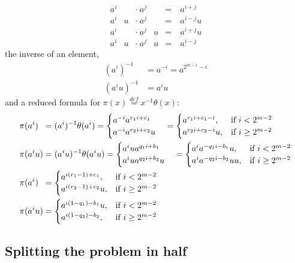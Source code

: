 \documentclass[11pt]{llncs}
\begin{document}
\[ \begin{aligned}
	a^i&  & \cdot\ a^j&  & =\ &a^{i+j} \\
	a^i&u & \cdot\ a^j&  & =\ &a^{i-j}u \\
	a^i&  & \cdot\ a^j&u & =\ &a^{i+j}u \\
	a^i&u & \cdot\ a^j&u & =\ &a^{i-j}
\end{aligned} \]
the inverse of an element,
\[ \begin{aligned}
(a^i)^{-1} &= a^{-i} = a^{2^{m-1}-i} \\
(a^iu)^{-1} &= a^iu
\end{aligned} \]
and a reduced formula for $\pi(x) \stackrel{def}{=} x^{-1}\theta(x)$:
\[ \begin{aligned}
&\pi(a^i)\hphantom{u} = (a^i)^{-1} \theta(a^i) = \begin{cases}
	a^{-i} a^{r_1i+c_1}\\
	a^{-i} a^{r_2i+c_2}u
\end{cases} = \begin{cases}
	a^{r_1i+c_1-i}, & \text{if } i < 2^{m-2} \\
	a^{r_2i+c_2-i}u, & \text{if } i \geq 2^{m-2}
\end{cases} \\
&\pi(a^iu) = (a^iu)^{-1} \theta(a^iu)
 = \begin{cases}
	a^iu a^{q_1i+b_1}\\
	a^iu a^{q_2i+b_2}u
\end{cases} = \begin{cases}
	a^i a^{-q_1i-b_1} u, & \text{if } i < 2^{m-2} \\
	a^i a^{-q_2i-b_2} uu, & \text{if }  i \geq 2^{m-2}
\end{cases} \\
&\pi(a^i)\hphantom{u} = \begin{cases}
	a^{i(r_1-1)+c_1}, & \text{if } i < 2^{m-2} \\
	a^{i(r_2-1)+c_2}u, & \text{if } i \geq 2^{m-2}
\end{cases} \\
&\pi(a^iu) = \begin{cases}
	a^{i(1-q_1)-b_1}u, & \text{if } i < 2^{m-2} \\
	a^{i(1-q_2)-b_2}, & \text{if }  i \geq 2^{m-2}
\end{cases}
\end{aligned} \]

\newpage
\subsection{Splitting the problem in half}
\end{document}
